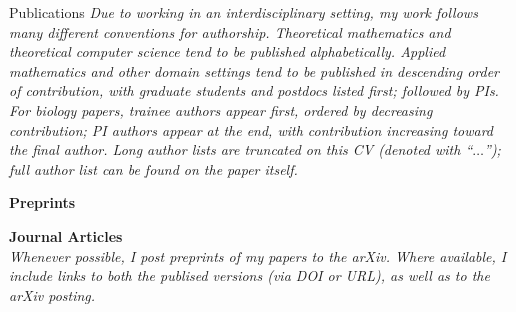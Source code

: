 \documentclass{resume} %
\begin{document}
\begin{rSection}{Publications}
\textit{Due to working in an interdisciplinary setting, my work follows many different conventions for authorship.
Theoretical mathematics and theoretical computer science tend to be published alphabetically.
Applied mathematics and other domain settings tend to be published in descending order of contribution, with graduate students and postdocs listed first; followed by PIs.
For biology papers, trainee authors appear first, ordered by decreasing contribution; PI authors appear at the end, with contribution increasing toward the final author. Long author lists are truncated on this CV (denoted with ``$\ldots$''); full author list can be found on the paper itself.
}
%
%


\nocite{*}

\textbf{Preprints}
\printbibliography[keyword = inSubmission, heading=none]


\textbf{Journal Articles}\\
\textit{Whenever possible, I post preprints of my papers to the arXiv. Where available, I include links to both the publised versions (via DOI or URL), as well as to the arXiv posting.}
\printbibliography[keyword = journal, heading=none]



\end{rSection}
\end{document}
